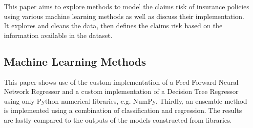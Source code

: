 This paper aims to explore methods to model the claims risk of insurance policies using various machine learning methods as well as discuss their implementation. It explores and cleans the data, then defines the claims risk based on the information available in the dataset.
\subsection{Machine Learning Methods}
    This paper shows use of the custom implementation of a Feed-Forward Neural Network Regressor and a custom implementation of a Decision Tree Regressor using only Python numerical libraries, e.g. NumPy. Thirdly, an ensemble method is implemented using a combination of classification and regression. The results are lastly compared to the outputs of the models constructed from libraries.
